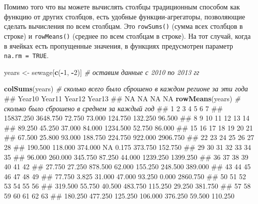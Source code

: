\documentclass[]{book}
\newenvironment{Shaded}{\begin{snugshade}}{\end{snugshade}}
\newcommand{\KeywordTok}[1]{\textcolor[rgb]{0.13,0.29,0.53}{\textbf{#1}}}
\newcommand{\DecValTok}[1]{\textcolor[rgb]{0.00,0.00,0.81}{#1}}
\newcommand{\StringTok}[1]{\textcolor[rgb]{0.31,0.60,0.02}{#1}}
\newcommand{\CommentTok}[1]{\textcolor[rgb]{0.56,0.35,0.01}{\textit{#1}}}
\newcommand{\OperatorTok}[1]{\textcolor[rgb]{0.81,0.36,0.00}{\textbf{#1}}}
\newcommand{\NormalTok}[1]{#1}
\begin{document}
Помимо того что вы можете вычислять столбцы традиционным способом как
функцию от других столбцов, есть удобные функции-агрегаторы, позволяющие
сделать вычисления по всем столбцам. Это \texttt{rowSums()} (сумма всех
столбцов в строке) и \texttt{rowMeans()} (среднее по всем столбцам в
строке). На тот случай, когда в ячейках есть пропущенные значения, в
функциях предусмотрен параметр \texttt{na.rm\ =\ TRUE}.

\begin{Shaded}
\begin{Highlighting}[]
\NormalTok{years <-}\StringTok{ }\NormalTok{sewage[}\KeywordTok{c}\NormalTok{(}\OperatorTok{-}\DecValTok{1}\NormalTok{, }\OperatorTok{-}\DecValTok{2}\NormalTok{)] }\CommentTok{# оставим данные с 2010 по 2013 гг}

\KeywordTok{colSums}\NormalTok{(years)  }\CommentTok{# сколько всего было сброшено в каждом регионе за эти года}
\NormalTok{## Year10 Year11 Year12 Year13 }
\NormalTok{##     NA     NA     NA     NA}
\KeywordTok{rowMeans}\NormalTok{(years) }\CommentTok{# сколько было сброшено в среднем за каждый год}
\NormalTok{##         1         2         3         4         5         6         7 }
\NormalTok{## 15837.250  3648.750    72.750    73.000   124.750   132.250    96.500 }
\NormalTok{##         8         9        10        11        12        13        14 }
\NormalTok{##    89.250    45.250    37.000    84.000  1234.500    52.750    86.000 }
\NormalTok{##        15        16        17        18        19        20        21 }
\NormalTok{##    67.500    25.800    93.000   188.750   224.750   922.000  2906.750 }
\NormalTok{##        22        23        24        25        26        27        28 }
\NormalTok{##   190.500   118.000   374.000        NA     0.175   373.750   152.750 }
\NormalTok{##        29        30        31        32        33        34        35 }
\NormalTok{##    96.000   260.000   345.750    87.250    44.000  1239.250  1399.250 }
\NormalTok{##        36        37        38        39        40        41        42 }
\NormalTok{##    27.750    27.250   878.500    62.000   155.250   248.500   389.000 }
\NormalTok{##        43        44        45        46        47        48        49 }
\NormalTok{##    77.750     3.825    31.000    47.000    93.250     0.000  2860.750 }
\NormalTok{##        50        51        52        53        54        55        56 }
\NormalTok{##   319.500    55.750    40.500   483.750   115.250    29.250   381.750 }
\NormalTok{##        57        58        59        60        61        62        63 }
\NormalTok{##   180.250   477.250   125.250   106.000   376.250    59.500   110.250 }

\end{Highlighting}
\end{Shaded}
\end{document}
